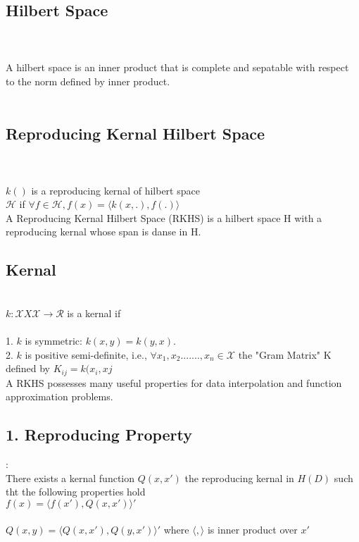 \subsection{Hilbert Space}\\\\

A hilbert space is an inner product that is complete and sepatable with respect to the norm defined by inner product.\\\\

\subsection{Reproducing Kernal Hilbert Space}\\\\
$k(  )$ is a reproducing kernal of hilbert space \\
$\mathcal{H}$ if $\forall f \in \mathcal{H}, f(x) = \langle k(x, .), f( .)\rangle$\\
A Reproducing Kernal Hilbert Space (RKHS) is a hilbert space  H with a reproducing kernal whose span is danse in H. \\

\subsection{Kernal}\\
 $k : \mathcal{X} X \mathcal{X} \rightarrow \mathcal{R}$ is a kernal if \\\\
 1. $k$ is symmetric: $k(x,y) = k(y,x)$.\\
 
2. $k$ is positive semi-definite, i.e.,  $\forall x_{1}, x_{2}.......,x_{n} \in \mathcal{X}$ the "Gram Matrix" K defined by $K_{ij} = k(x_{i}, x{j}$\\

  A RKHS possesses many useful properties for data interpolation and function approximation problems.\\
  
  \subsection{1. Reproducing Property}:\\
  There exists a kernal function $Q(x,x')$ the reproducing kernal in $H(D)$ such tht the following properties hold\\
   $f(x) = \langle f(x'), Q(x,x') \rangle '$\\\\
    $Q(x,y) = \langle Q(x,x'), Q(y,x') \rangle ' $ where $\langle , \rangle $ is inner product over $x'$\\\\
